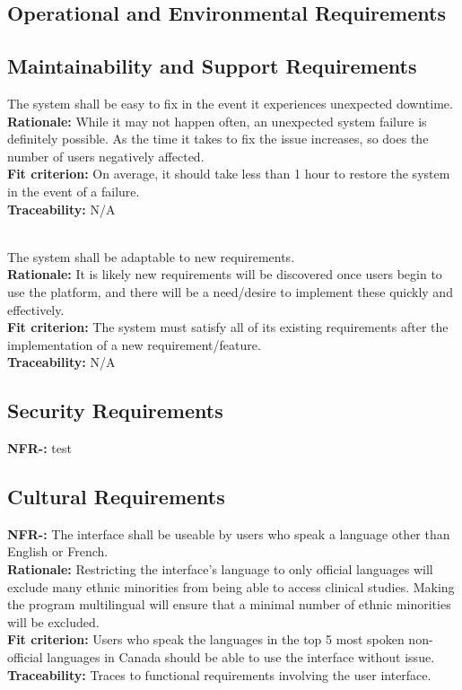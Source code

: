 \documentclass[12pt, titlepage]{article}
\newcounter{NFR_Counter}
\newcounter{FR_Counter}
\begin{document}
\subsection{Operational and Environmental Requirements}

\subsection{Maintainability and Support Requirements}


The system shall be easy to fix in the event it experiences unexpected downtime.\\
\textbf{Rationale:}
While it may not happen often, an unexpected system failure is definitely possible. As the time it takes 
to fix the issue increases, so does the number of users negatively affected.\\
\textbf{Fit criterion:}
On average, it should take less than 1 hour to restore the system in the event of a failure.\\
\textbf{Traceability:}
N/A \\~\\
\addtocounter{NFR_Counter}{1}


The system shall be adaptable to new requirements.\\
\textbf{Rationale:}
It is likely new requirements will be discovered once users begin to use the platform, and there will be a need/desire to 
implement these quickly and effectively.\\
\textbf{Fit criterion:}
The system must satisfy all of its existing requirements after the implementation of a new requirement/feature.\\
\textbf{Traceability:}
N/A
\addtocounter{NFR_Counter}{1}


\subsection{Security Requirements}
\noindent\textbf{NFR-\the\value{NFR_Counter}:}
test
\addtocounter{NFR_Counter}{1}

\subsection{Cultural Requirements}
\noindent\textbf{NFR-\the\value{NFR_Counter}:}
The interface shall be useable by users who speak a language other than English or French.  \\
\textbf{Rationale:}
Restricting the interface's language to only official languages will exclude many ethnic minorities from being able to access clinical studies. Making the program multilingual will ensure that a minimal number of ethnic minorities will be excluded. \\
\textbf{Fit criterion:}
Users who speak the languages in the top 5 most spoken non-official languages in Canada should be able to use the interface without issue. \\
\textbf{Traceability:}
Traces to functional requirements involving the user interface. \\~\\
\addtocounter{NFR_Counter}{1}
\end{document}
